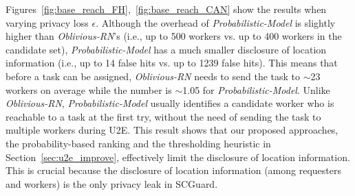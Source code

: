 \documentclass{USC-Thesis}
\newcommand{\SCG}{{SCGuard}}
\numberwithin{equation}{chapter}
\begin{document}

Figures~\ref{fig:base_reach_FH},~\ref{fig:base_reach_CAN} show the results when varying privacy loss $\epsilon$.
Although the overhead of \emph{Probabilistic-Model} is slightly higher than \emph{Oblivious-RN}'s (i.e., up to 500 workers vs. up to 400 workers in the candidate set), \emph{Probabilistic-Model} has a much smaller disclosure of location information (i.e., up to 14 false hits vs. up to 1239 false hits). This means that before a task can be assigned, \emph{Oblivious-RN} needs to send the task to $\sim$23 workers on average while the number is $\sim$1.05 for \emph{Probabilistic-Model}. Unlike \emph{Oblivious-RN}, \emph{Probabilistic-Model} usually identifies a candidate worker who is reachable to a task at the first try, without the need of sending the task to multiple workers during U2E. This result shows that our proposed approaches, the probability-based ranking and the thresholding heuristic in Section~\ref{sec:u2e_improve}, effectively limit the disclosure of location information.
This is crucial because the disclosure of location information (among requesters and workers) is the only privacy leak in \SCG.
\end{document}
